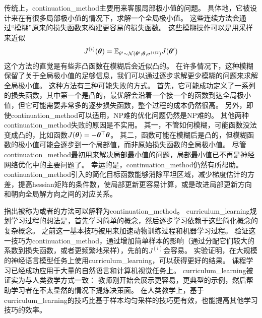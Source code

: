 传统上，\gls{continuation_method}主要用来客服局部极小值的问题。
具体地，它被设计来在有很多局部极小值的情况下，求解一个全局极小值。
这些连续方法会通过``模糊''原来的损失函数来构建更容易的损失函数。
这些模糊操作可以是用采样来近似
\begin{equation}
    J^{(i)}(\boldsymbol{\theta}) = \mathbb{E}_{\theta' \sim \mathcal{N}(\boldsymbol{\theta}'; \boldsymbol{\theta}, \sigma^{(i)2})} J(\boldsymbol{\theta}')
\end{equation}
这个方法的直觉是有些非凸函数在模糊后会近似凸的。
在许多情况下，这种模糊保留了关于全局极小值的足够信息，我们可以通过逐步求解更少模糊的问题来求解全局极小值。
这种方法有三种可能失败的方式。
首先，它可能成功定义了一系列的损失函数，其中第一个是凸的，最优解会沿着一个接一个的函数到达全局极小值，但它可能需要非常多的逐步损失函数，整个过程的成本仍然很高。
另外，即使\gls{continuation_method}可以适用，NP难的优化问题仍然是NP难的。
其他两种\gls{continuation_method}失败的原因是不实用。
其一，不管如何模糊，可能函数没法变成凸的，比如函数$J(\boldsymbol{\theta}) = -\boldsymbol{\theta}^\top \boldsymbol{\theta}$。
其二，函数可能在模糊后是凸的，但模糊函数的极小值可能会逐步到一个局部值，而非原始损失函数的全局极小值。
尽管\gls{continuation_method}最初用来解决局部最小值的问题，局部最小值已不再是神经网络优化中的主要问题了。
幸运的是，\gls{continuation_method}仍然有所帮助。
\gls{continuation_method}引入的简化目标函数能够消除平坦区域，减少梯度估计的方差，提高\gls{hessian}矩阵的条件数，使局部更新更容易计算，或是改进局部更新方向和朝向全局解方向之间的对应关系。

\cite{Bengio+al-2009}指出被称为或者的方法可以解释为\gls{continuation_method}。
\gls{curriculum_learning}规划学习过程的想法是，首先学习简单的概念，然后逐步学习依赖于这些简化概念的复杂概念。
之前这一基本技巧被用来加速动物训练过程\citep{Skinner1958,Peterson2004,Krueger+Dayan-2009}和机器学习过程\citep{solomonoff1989system,Elman93,Sanger-1994}。
\cite{Bengio+al-2009}验证这一技巧为\gls{continuation_method}，通过增加简单样本的影响（通过分配它们较大的系数到损失函数，或者更频繁地采样），先前的$J^{(i)}$会容易。
实验证明，在大规模的神经语言模型任务上使用\gls{curriculum_learning}，可以获得更好的结果。
课程学习已经成功应用于大量的自然语言\citep{Spitkovsky-et-al-HLT2010,collobert2011natural,Mikolov-ASRU-2011,Tu+Honavar-IJCAI2011}和计算机视觉\citep{Kumar+al-2010,Lee+Grauman-CVPR2011,Supancic+Ramanan-CVPR2013}任务上。
\gls{curriculum_learning}被证实为与人类教学方式一致\citep{Khan+Zhu+Mutlu-2011}：
教师刚开始会展示更容易，更典型的示例，然后帮助学习者在不太显然的情况下提炼决策面。
在人类教学上，基于\gls{curriculum_learning}的技巧比基于样本均匀采样的技巧更有效，也能提高其他学习技巧的效率\citep{Basu+Christensen-AAAI2013}。


